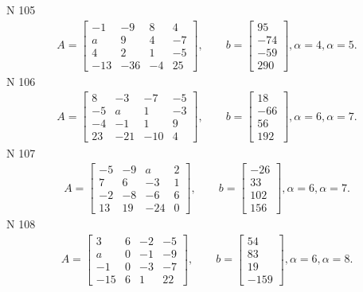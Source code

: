 \documentclass[11pt]{report}
\begin{document}
N 105
\begin{align*}
 A = \left[\begin{matrix}-1 & -9 & 8 & 4\\a & 9 & 4 & -7\\4 & 2 & 1 & -5\\-13 & -36 & -4 & 25\end{matrix}\right],
    \qquad b = \left[\begin{matrix}95\\-74\\-59\\290\end{matrix}\right], \alpha = 4, \alpha = 5. 
 \end{align*}
N 106
\begin{align*}
 A = \left[\begin{matrix}8 & -3 & -7 & -5\\-5 & a & 1 & -3\\-4 & -1 & 1 & 9\\23 & -21 & -10 & 4\end{matrix}\right],
    \qquad b = \left[\begin{matrix}18\\-66\\56\\192\end{matrix}\right], \alpha = 6, \alpha = 7. 
 \end{align*}
N 107
\begin{align*}
 A = \left[\begin{matrix}-5 & -9 & a & 2\\7 & 6 & -3 & 1\\-2 & -8 & -6 & 6\\13 & 19 & -24 & 0\end{matrix}\right],
    \qquad b = \left[\begin{matrix}-26\\33\\102\\156\end{matrix}\right], \alpha = 6, \alpha = 7. 
 \end{align*}
N 108
\begin{align*}
 A = \left[\begin{matrix}3 & 6 & -2 & -5\\a & 0 & -1 & -9\\-1 & 0 & -3 & -7\\-15 & 6 & 1 & 22\end{matrix}\right],
    \qquad b = \left[\begin{matrix}54\\83\\19\\-159\end{matrix}\right], \alpha = 6, \alpha = 8. 
 \end{align*}
\end{document}
